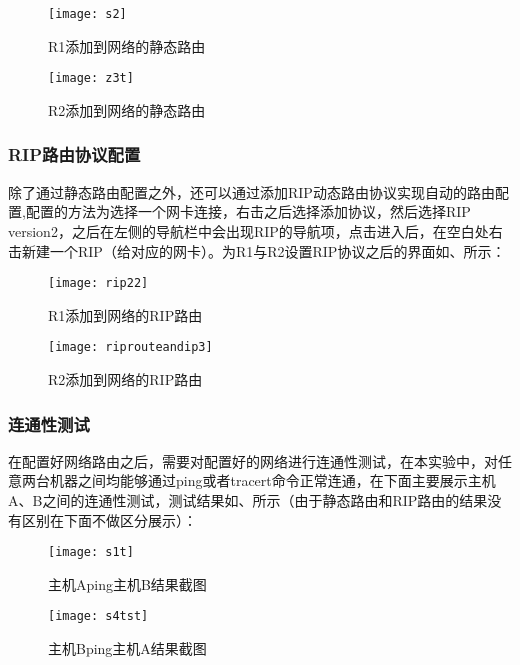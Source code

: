 \documentclass[lang=cn,11pt]{elegantpaper}
\begin{document}
\begin{figure}[htbp]
	\begin{minipage}[t]{0.48\textwidth}
	\centering
	\texttt{[image: s2]}
	\caption{R1添加到网络的静态路由\label{fig:static1}}
	\end{minipage}
\begin{minipage}[t]{0.48\textwidth}
	\centering
	\texttt{[image: z3t]}
	\caption{R2添加到网络的静态路由 \label{fig:static2}}
\end{minipage}
\end{figure}

\subsubsection{RIP路由协议配置}
除了通过静态路由配置之外，还可以通过添加RIP动态路由协议实现自动的路由配置,配置的方法为选择一个网卡连接，右击之后选择添加协议，然后选择RIP version2，之后在左侧的导航栏中会出现RIP的导航项，点击进入后，在空白处右击新建一个RIP（给对应的网卡）。为R1与R2设置RIP协议之后的界面如、所示：
\begin{figure}[htbp]
	\begin{minipage}[t]{0.48\textwidth}
		\centering
		\texttt{[image: rip22]}
		\caption{R1添加到网络的RIP路由\label{fig:rip1}}
	\end{minipage}
	\begin{minipage}[t]{0.48\textwidth}
		\centering
		\texttt{[image: riprouteandip3]}
		\caption{R2添加到网络的RIP路由 \label{fig:rip2}}
	\end{minipage}
\end{figure}

\subsubsection{连通性测试}
在配置好网络路由之后，需要对配置好的网络进行连通性测试，在本实验中，对任意两台机器之间均能够通过ping或者tracert命令正常连通，在下面主要展示主机A、B之间的连通性测试，测试结果如、所示（由于静态路由和RIP路由的结果没有区别在下面不做区分展示）：
\begin{figure}[htbp]
	\begin{minipage}[t]{0.48\textwidth}
		\centering
		\texttt{[image: s1t]}
		\caption{主机Aping主机B结果截图\label{fig:A}}
	\end{minipage}
	\begin{minipage}[t]{0.48\textwidth}
		\centering
		\texttt{[image: s4tst]}
		\caption{主机Bping主机A结果截图 \label{fig:B}}
	\end{minipage}
\end{figure}
\end{document}
